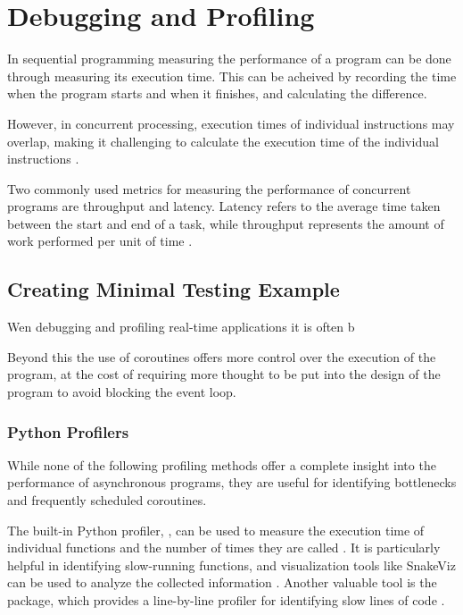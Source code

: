 
\section{Debugging and Profiling}
In sequential programming measuring the performance of a program can be done through measuring its execution time.
This can be acheived by recording the time when the program starts and when it finishes, and calculating the difference.

However, in concurrent processing, execution times of individual instructions may overlap, making it challenging to calculate the execution time of the individual instructions \cite[21]{volkovLatencyHiding2016}.

Two commonly used metrics for measuring the performance of concurrent programs are throughput and latency. Latency refers to the average time taken between the start and end of a task, while throughput represents the amount of work performed per unit of time \cite[21-23]{volkovLatencyHiding2016}.


\subsection{Creating Minimal Testing Example}


Wen debugging and profiling real-time applications it is often b

Beyond this the use of coroutines offers more control over the execution of the program, at the cost of requiring more thought to be put into the design of the program to avoid blocking the event loop.

\subsubsection{Python Profilers}
While none of the following profiling methods offer a complete insight into the performance of asynchronous \py programs, they are useful for identifying bottlenecks and frequently scheduled coroutines.

The built-in Python profiler, , can be used to measure the execution time of individual functions and the number of times they are called \cite{pythonsoftwarefoundationPythonProfilers}.
It is particularly helpful in identifying slow-running functions, and visualization tools like SnakeViz can be used to analyze the collected information \cite{davisSnakeViz2023}.
Another valuable tool is the  package, which provides a line-by-line profiler for identifying slow lines of code \cite{kernLineProfilerKernprof2023}.

